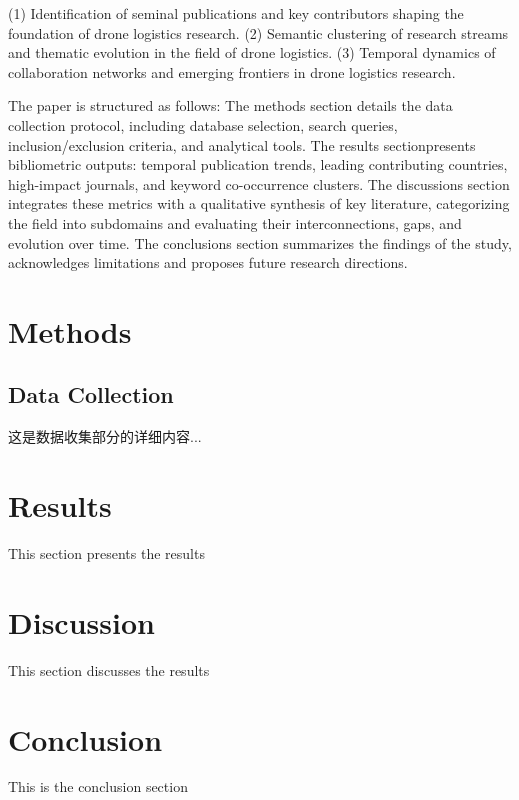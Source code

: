 \documentclass{article}
\begin{document}
(1) Identification of seminal publications and key contributors shaping the foundation of drone logistics research​.
(2) Semantic clustering of research streams and thematic evolution in the field of drone logistics.
(3) Temporal dynamics of collaboration networks and emerging frontiers​ in drone logistics research​.

The paper is structured as follows: The methods section​​ details the data collection protocol, including database selection, search queries, inclusion/exclusion criteria, and analytical tools. The results section​​ presents bibliometric outputs: temporal publication trends, leading contributing countries, high-impact journals, and keyword co-occurrence clusters. ​​The discussions​ section integrates these metrics with a qualitative synthesis of key literature, categorizing the field into subdomains and evaluating their interconnections, gaps, and evolution over time. The conclusions section​​ summarizes the findings of the study, acknowledges limitations and proposes future research directions.


\section{Methods}
\subsection{Data Collection} 
这是数据收集部分的详细内容...

\section{Results}
This section presents the results

\section{Discussion}
This section discusses the results

\section{Conclusion}
This is the conclusion section

\printbibliography
\end{document}

